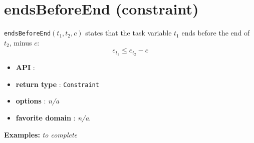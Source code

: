 \section{endsBeforeEnd (constraint)}\label{endsbeforeend:endsbeforeendconstraint}\hypertarget{endsbeforeend:endsbeforeendconstraint}{}
\begin{notedef}
  \texttt{endsBeforeEnd}$(t_1,t_2,c)$ states that the task variable $t_1$ ends before the end of $t_2$, minus $c$:
  $$e_{t_{1}} \le e_{t_{2}} - c$$
\end{notedef}

\begin{itemize}
	\item \textbf{API} :
	\item \textbf{return type} : \texttt{Constraint}
	\item \textbf{options} : \emph{n/a}
	\item \textbf{favorite domain} : \emph{n/a}.
\end{itemize}

\textbf{Examples:}
%
\emph{to complete}
